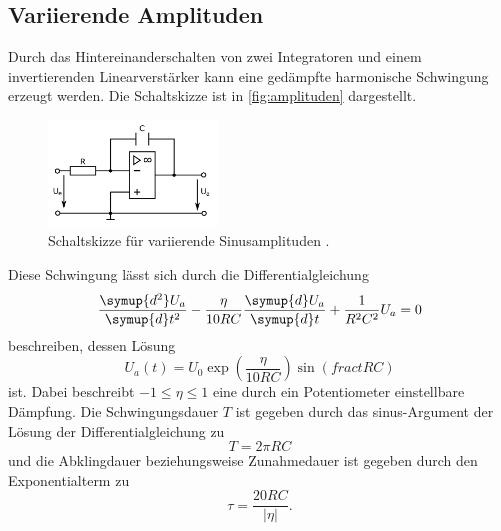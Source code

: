 \subsection{Variierende Amplituden}
Durch das Hintereinanderschalten von zwei Integratoren und einem invertierenden Linearverstärker
kann eine gedämpfte harmonische Schwingung erzeugt werden. Die Schaltskizze ist in 
\autoref{fig:amplituden} dargestellt.
\begin{figure}[H]
    \centering
    \includegraphics[width=0.4\textwidth]{integrator.png}
    \caption{Schaltskizze für variierende Sinusamplituden \cite{anleitung}.}
    \label{fig:amplituden}
\end{figure}
Diese Schwingung lässt sich durch die Differentialgleichung
\begin{equation*}
    \frac{\symup{d^2} U_a}{\symup{d} t^2} - \frac{\eta}{10 R C} \frac{\symup{d} U_a}{\symup{d} t} + \frac{1}{R^2 C^2} U_a = 0
\end{equation*}
beschreiben, dessen Lösung 
\begin{equation*}
    U_a (t) = U_0 \exp \left( \frac{\eta}{10 R C} \right) \sin \left(frac{t}{R C} \right)
\end{equation*}
ist.
Dabei beschreibt $ -1 \leq \eta \leq 1 $ eine durch ein Potentiometer einstellbare Dämpfung.
Die Schwingungsdauer $T$ ist gegeben durch das sinus-Argument der Lösung der Differentialgleichung zu
\begin{equation*}
    T = 2 \pi R C
\end{equation*}
und die Abklingdauer beziehungsweise Zunahmedauer ist gegeben durch den Exponentialterm zu
\begin{equation*}
    \tau = \frac{20 R C}{\vert \eta \vert}.
\end{equation*}
